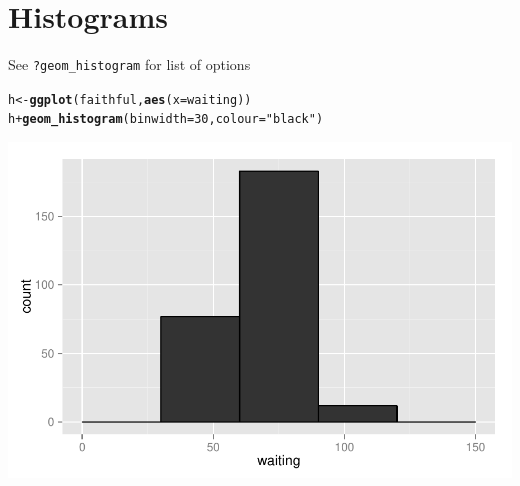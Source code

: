 \documentclass{beamer}\usepackage[]{graphicx}\usepackage[]{color}
\makeatletter
\newcommand{\hlnum}[1]{\textcolor[rgb]{0.686,0.059,0.569}{#1}}%
\newcommand{\hlstr}[1]{\textcolor[rgb]{0.192,0.494,0.8}{#1}}%
\newcommand{\hlopt}[1]{\textcolor[rgb]{0,0,0}{#1}}%
\newcommand{\hlstd}[1]{\textcolor[rgb]{0.345,0.345,0.345}{#1}}%
\newcommand{\hlkwb}[1]{\textcolor[rgb]{0.69,0.353,0.396}{#1}}%
\newcommand{\hlkwc}[1]{\textcolor[rgb]{0.333,0.667,0.333}{#1}}%
\newcommand{\hlkwd}[1]{\textcolor[rgb]{0.737,0.353,0.396}{\textbf{#1}}}%
\newenvironment{kframe}{%
 \def\at@end@of@kframe{}%
 \ifinner\ifhmode%
  \def\at@end@of@kframe{\end{minipage}}%
  \begin{minipage}{\columnwidth}%
 \fi\fi%
 \def\FrameCommand##1{\hskip\@totalleftmargin \hskip-\fboxsep
 \colorbox{shadecolor}{##1}\hskip-\fboxsep
     \hskip-\linewidth \hskip-\@totalleftmargin \hskip\columnwidth}%
 \MakeFramed {\advance\hsize-\width
   \@totalleftmargin\z@ \linewidth\hsize
   \@setminipage}}%
 {\par\unskip\endMakeFramed%
 \at@end@of@kframe}
\newenvironment{knitrout}{}{} %
\makeatother
\begin{document}

\section*{Histograms}
\frame{\sectionpage}


\begin{frame}[fragile]
See \texttt{?geom\_histogram} for list of options
\begin{knitrout}\footnotesize
{}\color{fgcolor}\begin{kframe}
\begin{alltt}
\hlstd{h} \hlkwb{<-} \hlkwd{ggplot}\hlstd{(faithful,} \hlkwd{aes}\hlstd{(}\hlkwc{x} \hlstd{= waiting))}
\hlstd{h} \hlopt{+} \hlkwd{geom_histogram}\hlstd{(}\hlkwc{binwidth} \hlstd{=} \hlnum{30}\hlstd{,} \hlkwc{colour} \hlstd{=} \hlstr{"black"}\hlstd{)}
\end{alltt}
\end{kframe}

{\centering \includegraphics[width=.75\linewidth]{figure/histogr} 

}



\end{knitrout}
\end{frame}

\end{document}
